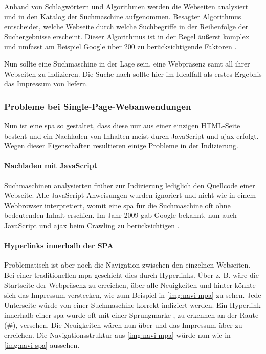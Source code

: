 Anhand von Schlagwörtern und Algorithmen werden die Webseiten analysiert und in den Katalog der Suchmaschine aufgenommen. Besagter Algorithmus entscheidet, welche Webseite durch welche Suchbegriffe in der Reihenfolge der Suchergebnisse erscheint. Dieser Algorithmus ist in der Regel äußerst komplex und umfasst am Beispiel Google über 200 zu berücksichtigende Faktoren \cite[S.163 f.]{EstherKessler2015}. 

Nun sollte eine Suchmaschine in der Lage sein, eine Webpräsenz samt all ihrer Webseiten zu indizieren. Die Suche nach  sollte hier im Idealfall als erstes Ergebnis das Impressum von  liefern. \\

\subsubsection{Probleme bei Single-Page-Webanwendungen}
Nun ist eine \ac{spa} so gestaltet, dass diese nur aus einer einzigen HTML-Seite besteht und ein Nachladen von Inhalten meist durch JavaScript und \ac{ajax} erfolgt. Wegen dieser Eigenschaften resultieren einige Probleme in der Indizierung.


\paragraph{Nachladen mit JavaScript}

Suchmaschinen analysierten früher zur Indizierung lediglich den Quellcode einer Webseite. Alle JavaScript-Anweisungen wurden ignoriert und nicht wie in einem Webbrowser interpretiert, womit eine \ac{spa} für die Suchmaschine oft ohne bedeutenden Inhalt erschien. Im Jahr 2009 gab Google bekannt, nun auch JavaScript und \ac{ajax} beim Crawling zu berücksichtigen \cite{Google2009}.\\

\paragraph{Hyperlinks innerhalb der SPA}
Problematisch ist aber noch die Navigation zwischen den einzelnen Webseiten. Bei einer traditionellen \ac{mpa} geschieht dies durch Hyperlinks. Über z. B.  wäre die Startseite der Webpräsenz zu erreichen, über  alle Neuigkeiten und hinter  könnte sich das Impressum verstecken, wie zum Beispiel in \autoref{img:navi-mpa} zu sehen. Jede Unterseite würde von einer Suchmaschine korrekt indiziert werden. Ein Hyperlink innerhalb einer \ac{spa} wurde oft mit einer Sprungmarke \cite{Consortium2016}, zu erkennen an der Raute (\#), versehen. Die Neuigkeiten wären nun über  und das Impressum über  zu erreichen. Die Navigationsstruktur aus \autoref{img:navi-mpa} würde nun wie in \autoref{img:navi-spa} aussehen.

